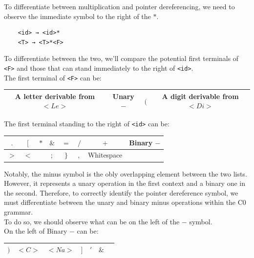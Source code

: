To differentiate between multiplication and pointer dereferencing, we need to observe the immediate symbol to the right of the \(\ast\).

\begin{verbatim}
    <id> → <id>*
    <T> → <T>*<F>
\end{verbatim}

To differentiate between the two, we'll compare the potential first terminals of \texttt{<F>} and those that can stand immediately to the right of \texttt{<id>}.\\

The first terminal of \texttt{<F>} can be:
\begin{center}
    \begin{tabular}{|c|c|c|c|}
        \hline
        A letter derivable from \( <Le> \) & Unary \( - \) & \( ( \) & A digit derivable from \( <Di> \) \\
        \hline
    \end{tabular}
\end{center}

The first terminal standing to the right of \texttt{<id>} can be:
\begin{center}
    \begin{tabular}{|c|c|c|c|c|c|c|c|}
        \hline
        \( . \) & \( [ \) & \( \ast \) & \( \& \) & \( = \) & \( / \) & \( + \) & Binary \( - \)\\
        \hline
        \( > \) & \( < \) & \( \! \) & \( ; \) & \( \} \) & \( , \) & Whitespace & \\
        \hline
    \end{tabular}
\end{center}

Notably, the minus symbol is the obly overlapping element between the two lists. However, it represents a unary operation in the first context and a binary one in the second. Therefore, to correctly identify the pointer dereference symbol, we must differentiate between the unary and binary minus operations within the C0 grammar.\\

To do so, we should observe what can be on the left of the \(-\) symbol.\\

On the left of Binary \(-\) can be:
\begin{center}
    \begin{tabular}{|c|c|c|c|c|c|c|}
        \hline
        \( ) \) & \( <C> \) & \( <Na> \) & \( ] \) & \( ' \) & \( \& \)\\
        \hline
    \end{tabular}
\end{center}

